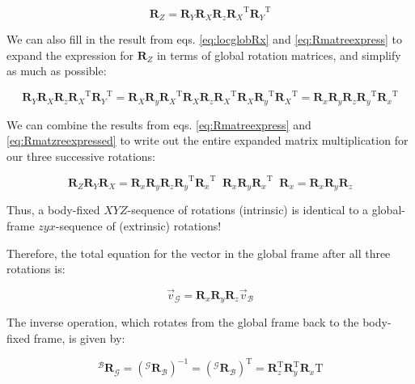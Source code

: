 \documentclass{article}
\begin{document}
\begin{equation}
    \mathbf{R}_Z = \mathbf{R}_Y \mathbf{R}_X \mathbf{R}_z {\mathbf{R}_X}^\mathrm{T} {\mathbf{R}_Y}^\mathrm{T}
\end{equation}

We can also fill in the result from eqs. \ref{eq:locglobRx} and \ref{eq:Rmatreexpress} to expand the expression for \( \mathbf{R}_Z \) in terms of global rotation matrices, and simplify as much as possible:

\begin{equation}
    \mathbf{R}_Y \mathbf{R}_X \mathbf{R}_z {\mathbf{R}_X}^\mathrm{T} {\mathbf{R}_Y}^\mathrm{T} = \mathbf{R}_X \mathbf{R}_y {\mathbf{R}_X}^\mathrm{T} \mathbf{R}_X \mathbf{R}_z {\mathbf{R}_X}^\mathrm{T} \mathbf{R}_X {\mathbf{R}_y}^\mathrm{T} {\mathbf{R}_X}^\mathrm{T} = \mathbf{R}_x \mathbf{R}_y  \mathbf{R}_z {\mathbf{R}_y}^\mathrm{T} {\mathbf{R}_x}^\mathrm{T} 
    \label{eq:Rmatzreexpressed}
\end{equation}

We can combine the results from eqs.  \ref{eq:Rmatreexpress} and \ref{eq:Rmatzreexpressed} to write out the entire expanded matrix multiplication for our three successive rotations:

\begin{equation}
    \mathbf{R}_Z \mathbf{R}_Y \mathbf{R}_X  = \mathbf{R}_x \mathbf{R}_y  \mathbf{R}_z {\mathbf{R}_y}^\mathrm{T} {\mathbf{R}_x}^\mathrm{T} \; \;  \mathbf{R}_x \mathbf{R}_y {\mathbf{R}_x}^\mathrm{T} \; \; \mathbf{R}_x = \mathbf{R}_x \mathbf{R}_y  \mathbf{R}_z 
\end{equation}

Thus, a body-fixed \( XYZ \)-sequence of rotations (intrinsic) is identical to a global-frame \(zyx\)-sequence of (extrinsic) rotations!

Therefore, the total equation for the vector in the global frame after all three rotations is:

\begin{equation}
\vec{v}_{\mathcal{G}} = \mathbf{R}_x \mathbf{R}_y \mathbf{R}_z \vec{v}_{\mathcal{B}}
\end{equation}


The inverse operation, which rotates from the global frame back to the body-fixed frame, is given by:

\begin{equation}
{}^{\mathcal{B}} \mathbf{R}_{\mathcal{G}} = ({}^{\mathcal{G}} \mathbf{R}_{\mathcal{B}})^{-1} = ({}^{\mathcal{G}} \mathbf{R}_{\mathcal{B}})^\mathrm{T} = \mathbf{R}_z^\mathrm{T} \mathbf{R}_y^\mathrm{T} \mathbf{R}_x\mathrm{T}
\end{equation}
\end{document}
